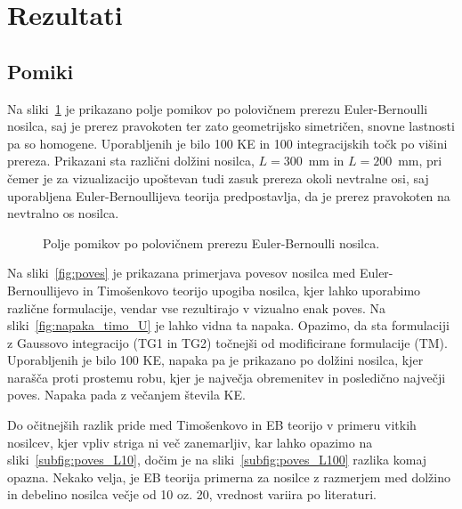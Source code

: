 \FloatBarrier

\section{Rezultati}

\subsection{Pomiki}

Na sliki~\ref{fig:polje_poves} je prikazano polje pomikov po polovičnem prerezu Euler-Bernoulli nosilca, saj je prerez pravokoten ter zato geometrijsko simetričen, snovne lastnosti pa so homogene. Uporabljenih je bilo 100 KE in 100 integracijskih točk po višini prereza. Prikazani sta različni dolžini nosilca, $L=300$~mm in $L=200$~mm, pri čemer je za vizualizacijo upoštevan tudi zasuk prereza okoli nevtralne osi, saj uporabljena Euler-Bernoullijeva teorija predpostavlja, da je prerez pravokoten na nevtralno os nosilca.

\begin{figure}[ht]
    \centering
    \caption{Polje pomikov po polovičnem prerezu Euler-Bernoulli nosilca.}
    \label{fig:polje_poves}
\end{figure}

Na sliki~\ref{fig:poves} je prikazana primerjava povesov nosilca med Euler-Bernoullijevo in Timošenkovo teorijo upogiba nosilca, kjer lahko uporabimo različne formulacije, vendar vse rezultirajo v vizualno enak poves. Na sliki~\ref{fig:napaka_timo_U} je lahko vidna ta napaka. Opazimo, da sta formulaciji z Gaussovo integracijo (TG1 in TG2) točnejši od modificirane formulacije (TM). Uporabljenih je bilo 100 KE, napaka pa je prikazano po dolžini nosilca, kjer narašča proti prostemu robu, kjer je največja obremenitev in posledično največji poves. Napaka pada z večanjem števila KE.



Do očitnejših razlik pride med Timošenkovo in EB teorijo v primeru vitkih nosilcev, kjer vpliv striga ni več zanemarljiv, kar lahko opazimo na sliki~\ref{subfig:poves_L10}, dočim je na sliki~\ref{subfig:poves_L100} razlika komaj opazna. Nekako velja, je EB teorija primerna za nosilce z razmerjem med dolžino in debelino nosilca večje od 10 oz. 20, vrednost variira po literaturi.

